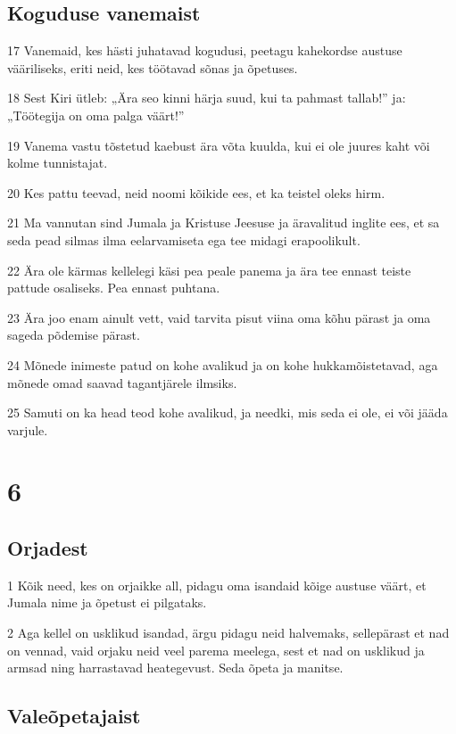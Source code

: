 \section*{Koguduse vanemaist}

\par 17 Vanemaid, kes hästi juhatavad kogudusi, peetagu kahekordse austuse vääriliseks, eriti neid, kes töötavad sõnas ja õpetuses.
\par 18 Sest Kiri ütleb: „Ära seo kinni härja suud, kui ta pahmast tallab!” ja: „Töötegija on oma palga väärt!”
\par 19 Vanema vastu tõstetud kaebust ära võta kuulda, kui ei ole juures kaht või kolme tunnistajat.
\par 20 Kes pattu teevad, neid noomi kõikide ees, et ka teistel oleks hirm.
\par 21 Ma vannutan sind Jumala ja Kristuse Jeesuse ja äravalitud inglite ees, et sa seda pead silmas ilma eelarvamiseta ega tee midagi erapoolikult.
\par 22 Ära ole kärmas kellelegi käsi pea peale panema ja ära tee ennast teiste pattude osaliseks. Pea ennast puhtana.
\par 23 Ära joo enam ainult vett, vaid tarvita pisut viina oma kõhu pärast ja oma sageda põdemise pärast.
\par 24 Mõnede inimeste patud on kohe avalikud ja on kohe hukkamõistetavad, aga mõnede omad saavad tagantjärele ilmsiks.
\par 25 Samuti on ka head teod kohe avalikud, ja needki, mis seda ei ole, ei või jääda varjule.


\chapter{6}

\section*{Orjadest}

\par 1 Kõik need, kes on orjaikke all, pidagu oma isandaid kõige austuse väärt, et Jumala nime ja õpetust ei pilgataks.
\par 2 Aga kellel on usklikud isandad, ärgu pidagu neid halvemaks, sellepärast et nad on vennad, vaid orjaku neid veel parema meelega, sest et nad on usklikud ja armsad ning harrastavad heategevust. Seda õpeta ja manitse.

\section*{Valeõpetajaist}

